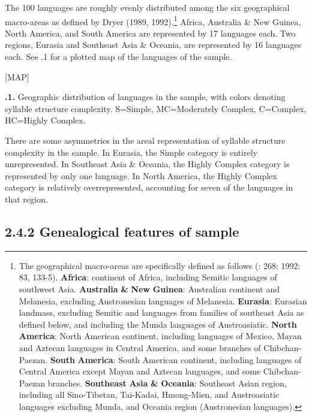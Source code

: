   The 100 languages are roughly evenly distributed among the six geographical macro-areas as defined by Dryer (1989, 1992).\footnote{ \textrm{The geographical macro-areas are specifically defined as follows (\citealt{Dryer1989}: 268; 1992: 83, 133-5).} \textrm{\textbf{Africa}}\textrm{: continent of Africa, including Semitic languages of southwest Asia.} \textrm{\textbf{Australia} \textbf{\&} \textbf{New} \textbf{Guinea}}\textrm{: Australian continent and Melanesia, excluding Austronesian languages of Melanesia.} \textrm{\textbf{Eurasia}}\textrm{: Eurasian landmass, excluding Semitic and languages from families of southeast Asia as defined below, and including the Munda languages of Austroasiatic.} \textrm{\textbf{North} \textbf{America}}\textrm{: North American continent, including languages of Mexico, Mayan and Aztecan languages in Central America, and some branches of Chibchan-Paezan.} \textrm{\textbf{South} \textbf{America}}\textrm{: South American continent, including languages of Central America except Mayan and Aztecan languages, and some Chibchan-Paezan branches.} \textrm{\textbf{Southeast} \textbf{Asia} \textbf{\&} \textbf{Oceania}}\textrm{: Southeast Asian region, including all Sino-Tibetan, Tai-Kadai, Hmong-Mien, and Austroasiatic languages excluding Munda, and Oceania region (Austronesian languages).}} Africa, Australia \& New Guinea, North America, and South America are represented by 17 languages each. Two regions, Eurasia and Southeast Asia \& Oceania, are represented by 16 languages each. See .1 for a plotted map of the languages of the sample.



[MAP]



\textbf{.1.} Geographic distribution of languages in the sample, with colors denoting syllable structure complexity. S=Simple, MC=Moderately Complex, C=Complex, HC=Highly Complex.



  There are some asymmetries in the areal representation of syllable structure complexity in the sample. In Eurasia, the Simple category is entirely unrepresented. In Southeast Asia \& Oceania, the Highly Complex category is represented by only one language. In North America, the Highly Complex category is relatively overrepresented, accounting for seven of the languages in that region.


\subsection{2.4.2 Genealogical features of sample}

